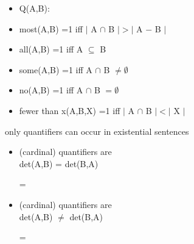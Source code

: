 \documentclass[headrule,footrule]{foils}
\begin{document}
\begin{itemize}
\item Q(A,B): 
\item most(A,B) =1 iff $|$ A $\cap$ B $| > |$ A $-$ B $|$ 
\item all(A,B) =1 iff  A $\subseteq$ B  
\item some(A,B) =1 iff  A $\cap$ B $\ne \emptyset$ 
\item no(A,B) =1 iff A $\cap$ B  $= \emptyset$ 
\item fewer than x(A,B,X) =1 iff $|$ A $\cap$ B $| <  |$ X $|$ 
\end{itemize}


\begin{exe}
  \ex only  quantifiers can occur in existential  sentences
  \begin{xlist}
    \ex {}
    \ex {}
    \ex {}
    \ex {}
  \end{xlist}
\end{exe}
\begin{itemize}
\item {} (cardinal) quantifiers are 
  \\ det(A,B) = det(B,A)
  \begin{exe}
    \ex {}   = 
  \end{exe}
\item {} (cardinal) quantifiers are 
  \\ det(A,B) $\ne$ det(B,A)
  \begin{exe}
    \ex {}   = 
  \end{exe}

\end{itemize}

\end{document}
